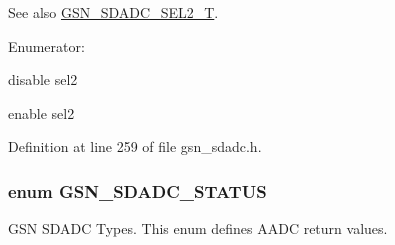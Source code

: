 \begin{DoxySeeAlso}{See also}
\hyperlink{a00652_ga21776f699fb060e738c464107e435df4}{GSN\_\-SDADC\_\-SEL2\_\-T}. 
\end{DoxySeeAlso}
\begin{Desc}
\item[Enumerator: ]\par
\begin{description}
\item[{\em 
\hypertarget{a00652_ggad596a4cc54081bcce130d18d07fd701aa441f0c848f12eda7c5bc0d04f5a831c2}{
GSN\_\-SDADC\_\-SEL2\_\-DISABLE}
\label{a00652_ggad596a4cc54081bcce130d18d07fd701aa441f0c848f12eda7c5bc0d04f5a831c2}
}]disable sel2 \item[{\em 
\hypertarget{a00652_ggad596a4cc54081bcce130d18d07fd701aa0e791e446dbe8195d30bca0683096adf}{
GSN\_\-SDADC\_\-SEL2\_\-ENABLE}
\label{a00652_ggad596a4cc54081bcce130d18d07fd701aa0e791e446dbe8195d30bca0683096adf}
}]enable sel2 \end{description}
\end{Desc}



Definition at line 259 of file gsn\_\-sdadc.h.

\hypertarget{a00652_ga179a090b2c7d55f208c9a4a6c79eda05}{
\subsubsection[{GSN\_\-SDADC\_\-STATUS}]{\setlength{\rightskip}{0pt plus 5cm}enum {\bf GSN\_\-SDADC\_\-STATUS}}}
\label{a00652_ga179a090b2c7d55f208c9a4a6c79eda05}


GSN SDADC Types. This enum defines AADC return values. 

